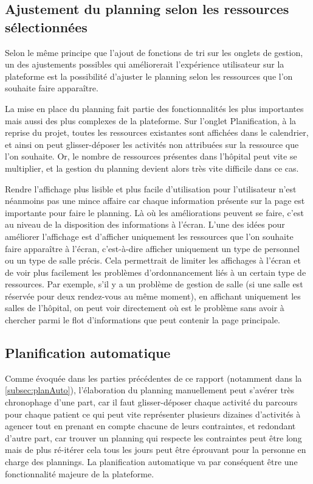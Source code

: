 \documentclass[noposter]{polytech/polytech}
\begin{document}
\subsection{Ajustement du planning selon les ressources sélectionnées}

Selon le même principe que l'ajout de fonctions de tri sur les onglets de gestion, un des ajustements possibles qui améliorerait l'expérience utilisateur sur la plateforme est la possibilité d'ajuster le planning selon les ressources que l'on souhaite faire apparaître.

La mise en place du planning fait partie des fonctionnalités les plus importantes mais aussi des plus complexes de la plateforme. Sur l'onglet Planification, à la reprise du projet, toutes les ressources existantes sont affichées dans le calendrier, et ainsi on peut glisser-déposer les activités non attribuées sur la ressource que l'on souhaite. Or, le nombre de ressources présentes dans l'hôpital peut vite se multiplier, et la gestion du planning devient alors très vite difficile dans ce cas.

Rendre l'affichage plus lisible et plus facile d'utilisation pour l'utilisateur n'est néanmoins pas une mince affaire car chaque information présente sur la page est importante pour faire le planning. Là où les améliorations peuvent se faire, c'est au niveau de la disposition des informations à l'écran. L'une des idées pour améliorer l'affichage est d'afficher uniquement les ressources que l'on souhaite faire apparaître à l'écran, c'est-à-dire afficher uniquement un type de personnel ou un type de salle précis. Cela permettrait de limiter les affichages à l'écran et de voir plus facilement les problèmes d'ordonnancement liés à un certain type de ressources. Par exemple, s'il y a un problème de gestion de salle (si une salle est réservée pour deux rendez-vous au même moment), en affichant uniquement les salles de l'hôpital, on peut voir directement où est le problème sans avoir à chercher parmi le flot d'informations que peut contenir la page principale. 


\subsection{Planification automatique}

Comme évoquée dans les parties précédentes de ce rapport (notamment dans la \autoref{subsec:planAuto}), l'élaboration du planning manuellement peut s'avérer très chronophage d'une part, car il faut glisser-déposer chaque activité du parcours pour chaque patient ce qui peut vite représenter plusieurs dizaines d'activités à agencer tout en prenant en compte chacune de leurs contraintes, et redondant d'autre part, car trouver un planning qui respecte les contraintes peut être long mais de plus ré-itérer cela tous les jours peut être éprouvant pour la personne en charge des plannings. La planification automatique va par conséquent être une fonctionnalité majeure de la plateforme. 
\end{document}
